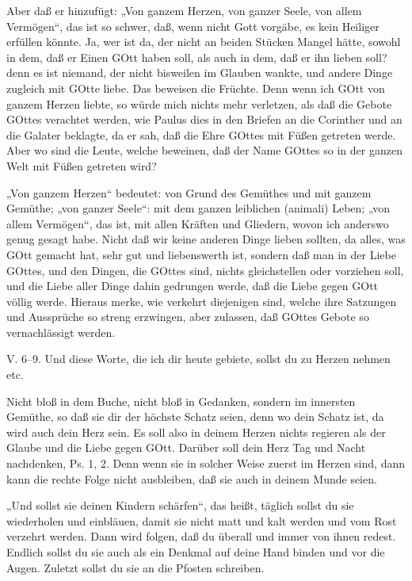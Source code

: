 Aber daß er hinzufügt: „Von ganzem Herzen, von ganzer Seele, von allem Vermögen“, das ist so schwer, daß, wenn nicht Gott vorgäbe, es kein Heiliger erfüllen könnte. Ja, wer ist da, der nicht an beiden Stücken Mangel hätte, sowohl in dem, daß er Einen GOtt haben soll, als auch in dem, daß er ihn lieben soll? denn
es ist niemand, der nicht bisweilen im Glauben wankte, und andere Dinge zugleich mit GOtte liebe. Das beweisen die Früchte. Denn wenn ich GOtt von ganzem Herzen liebte, so würde mich nichts mehr verletzen, als daß die Gebote GOttes verachtet werden, wie Paulus dies in den Briefen an die Corinther und an die Galater beklagte, da er sah, daß die Ehre GOttes mit Füßen getreten werde. Aber wo sind die Leute, welche beweinen, daß der Name GOttes so in der ganzen Welt mit Füßen getreten wird?

„Von ganzem Herzen“ bedeutet: von Grund des Gemüthes und mit ganzem Gemüthe; „von ganzer Seele“: mit dem ganzen leiblichen (animali) Leben; „von allem Vermögen“, das ist, mit allen Kräften und Gliedern, wovon ich anderswo genug gesagt habe. Nicht daß wir keine anderen Dinge lieben sollten, da alles, was GOtt gemacht hat, sehr gut und liebenswerth ist, sondern daß man in der Liebe GOttes, und den Dingen, die GOttes sind, nichts gleichstellen oder vorziehen soll, und die Liebe aller Dinge dahin gedrungen werde, daß die Liebe gegen GOtt völlig werde. Hieraus merke, wie verkehrt diejenigen sind, welche ihre Satzungen und Aussprüche so streng erzwingen, aber zulassen, daß GOttes Gebote so vernachlässigt werden.

\begin{schriftzitat}
V. 6–9. Und diese Worte, die ich dir heute gebiete, sollst du zu Herzen nehmen etc.
\end{schriftzitat}

Nicht bloß in dem Buche, nicht bloß in Gedanken, sondern im innersten Gemüthe, so daß sie dir der höchste Schatz seien, denn wo dein Schatz ist, da wird auch dein Herz sein. Es soll also in deinem Herzen nichts regieren als der Glaube und die Liebe gegen GOtt. Darüber soll dein Herz Tag und Nacht nachdenken, Ps. 1, 2. Denn wenn sie in solcher Weise zuerst im Herzen sind, dann kann die rechte Folge nicht ausbleiben, daß sie auch in deinem Munde seien.

„Und sollst sie deinen Kindern schärfen“, das heißt, täglich sollst du sie wiederholen und einbläuen, damit sie nicht matt und kalt werden und vom Rost verzehrt werden. Dann wird folgen, daß du überall und immer von ihnen redest. Endlich sollst du sie auch als ein Denkmal auf deine Hand binden und vor die Augen. Zuletzt sollst du sie an die Pfosten schreiben.

